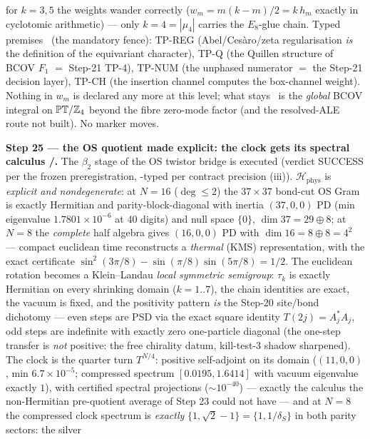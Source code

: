 for $k = 3, 5$ the weights wander correctly ($w_m = m(k-m)/2 = k\,h_m$ exactly in cyclotomic
arithmetic) --- only $k = 4 = |\mu_4|$ carries the $E_8$-glue chain. Typed premises \mC\ (the
mandatory fence): TP-REG (Abel/Ces\`aro/zeta regularisation \emph{is} the definition of the
equivariant character), TP-Q (the Quillen structure of BCOV $F_1$ $=$ Step-21 TP-4), TP-NUM
(the unphased numerator $=$ the Step-21 decision layer), TP-CH (the insertion channel computes
the box-channel weight). Nothing in $w_m$ is declared any more at this level; what stays \mO\
is the \emph{global} BCOV integral on $\mathbb{PT}/\mathbb{Z}_4$ beyond the fibre zero-mode factor
(and the resolved-ALE route not built). No marker moves.

\par\smallskip\noindent\textbf{Step 25 --- the OS quotient made explicit: the clock gets its
spectral calculus \mE/\mC.} The $\beta_2$ stage of the OS twistor bridge is executed (verdict
SUCCESS per the frozen preregistration, \mC-typed per contract precision (iii)).
$\mathcal H_{\mathrm{phys}}$ is \emph{explicit and nondegenerate}: at $N = 16$ ($\deg\le2$)
the $37{\times}37$ bond-cut OS Gram is exactly Hermitian and parity-block-diagonal with
inertia $(37,0,0)$ PD (min eigenvalue $1.7801\times10^{-6}$ at $40$ digits) and null space
$\{0\}$, $\dim 37 = 29 \oplus 8$; at $N = 8$ the \emph{complete} half algebra gives $(16,0,0)$
PD with $\dim 16 = 8 \oplus 8 = 4^2$ --- compact euclidean time reconstructs a \emph{thermal}
(KMS) representation, with the exact certificate $\sin^2(3\pi/8) - \sin(\pi/8)\sin(5\pi/8) =
1/2$. The euclidean rotation becomes a Klein--Landau \emph{local symmetric semigroup}:
$\tau_k$ is exactly Hermitian on every shrinking domain ($k = 1..7$), the chain identities are
exact, the vacuum is fixed, and the positivity pattern \emph{is} the Step-20 site/bond
dichotomy --- even steps are PSD via the exact square identity $T(2j) = A_j^*A_j$, odd steps
are indefinite with exactly zero one-particle diagonal (the one-step transfer is \emph{not}
positive: the free chirality datum, kill-test-3 shadow sharpened). The clock is the quarter
turn $T^{N/4}$: positive self-adjoint on its domain ($(11,0,0)$, min $6.7\times10^{-5}$;
compressed spectrum $[0.0195, 1.6414]$ with vacuum eigenvalue exactly $1$), with certified
spectral projections ($\sim10^{-40}$) --- exactly the calculus the non-Hermitian pre-quotient
average of Step 23 could not have --- and at $N = 8$ the compressed clock spectrum is
\emph{exactly} $\{1, \sqrt2 - 1\} = \{1, 1/\delta_S\}$ in both parity sectors: the silver
